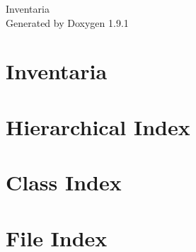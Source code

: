 \let\mypdfximage\pdfximage\def\pdfximage{\immediate\mypdfximage}\documentclass[twoside]{book}
\newcommand{\+}{\discretionary{\mbox{\scriptsize$\hookleftarrow$}}{}{}}
\newcommand{\clearemptydoublepage}{%
  \newpage{\pagestyle{empty}\cleardoublepage}%
}
\begin{document}
\raggedbottom

\hypersetup{pageanchor=false,
             bookmarksnumbered=true,
             pdfencoding=unicode
            }
\begin{titlepage}
\vspace*{7cm}
\begin{center}%
{\Large Inventaria }\\
\vspace*{1cm}
{\large Generated by Doxygen 1.9.1}\\
\end{center}
\end{titlepage}
\clearemptydoublepage
{}
\tableofcontents
\clearemptydoublepage
{}
\hypersetup{pageanchor=true}

\chapter{Inventaria}
\label{md_README}

\chapter{Hierarchical Index}

\chapter{Class Index}

\chapter{File Index}

\end{document}
